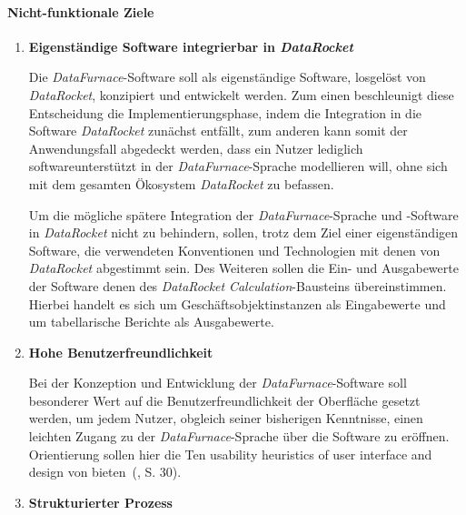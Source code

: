 \documentclass[
  language=german, %
  type=bachelor%
]{isthesis}
\begin{document}
\begin{content}
\begin{enumerate}
  \end{enumerate}

  \paragraph{Nicht-funktionale Ziele}
  \begin{enumerate}

    \item \textbf{Eigenständige Software integrierbar in \textit{DataRocket}}

      Die \textit{DataFurnace}-Software soll als eigenständige Software,
      losgelöst von \textit{DataRocket}, konzipiert und entwickelt werden. Zum
      einen beschleunigt diese Entscheidung die Implementierungsphase, indem
      die Integration in die Software \textit{DataRocket} zunächst entfällt,
      zum anderen kann somit der Anwendungsfall abgedeckt werden, dass ein Nutzer
      lediglich softwareunterstützt in der \textit{DataFurnace}-Sprache
      modellieren will, ohne sich mit dem gesamten Ökosystem
      \textit{DataRocket} zu befassen.

      Um die mögliche spätere Integration der \textit{DataFurnace}-Sprache und
      -Software in \textit{DataRocket} nicht zu behindern, sollen, trotz dem
      Ziel einer eigenständigen Software, die verwendeten Konventionen und
      Technologien mit denen von \textit{DataRocket} abgestimmt sein.  Des
      Weiteren sollen die Ein- und Ausgabewerte der Software denen des
      \textit{DataRocket} \textit{Calculation}-Bausteins übereinstimmen.
      Hierbei handelt es sich um Geschäftsobjektinstanzen als Eingabewerte und
      um tabellarische Berichte als Ausgabewerte.

    \item \textbf{Hohe Benutzerfreundlichkeit}

      Bei der Konzeption und Entwicklung der \textit{DataFurnace}-Software soll
      besonderer Wert auf die Benutzerfreundlichkeit der Oberfläche gesetzt
      werden, um jedem Nutzer, obgleich seiner bisherigen Kenntnisse,  einen
      leichten Zugang zu der \textit{DataFurnace}-Sprache über die Software zu
      eröffnen. Orientierung sollen hier die \glqq{}Ten usability heuristics of
      user interface and design\grqq{} von
      \textsc{\citeauthor{nielsen1994heuristic}}
      bieten~(\citeyear{nielsen1994heuristic}, S. 30).

    \item \textbf{Strukturierter Prozess}
      

\end{enumerate}
\end{content}
\end{document}
